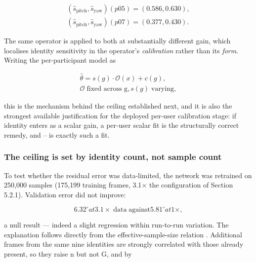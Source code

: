 \begin{equation}
\label{eq:219}
\begin{aligned}
( \hat{s}_{\mathrm{pitch}}, \hat{s}_{\mathrm{yaw}} )(p05) = ( 0.586, 0.630 ) , \\
( \hat{s}_{\mathrm{pitch}}, \hat{s}_{\mathrm{yaw}} )(p07) = ( 0.377, 0.430 ) .
\end{aligned}
\end{equation}

The same operator is applied to both at substantially different gain, which localises identity sensitivity in the operator's \emph{calibration} rather than its \emph{form}. Writing the per-participant model as

\begin{equation}
\label{eq:220}
\begin{aligned}
\hat{\theta } = s(g) \cdot \mathcal{O}(x) + c(g) , \\
\mathcal{O} \;\text{fixed across g} , s(g) \;\text{varying} ,
\end{aligned}
\end{equation}

this is the mechanism behind the ceiling established next, and it is also the strongest available justification for the deployed per-user calibration stage: if identity enters as a scalar gain, a per-user scalar fit is the structurally correct remedy, and -- is exactly such a fit.

\subsubsection{The ceiling is set by identity count, not sample count}

To test whether the residual error was data-limited, the network was retrained on 250,000 samples (175,199 training frames, 3.1$\times$ the configuration of Section 5.2.1). Validation error did not improve:

\begin{equation}
\label{eq:221}
6.32^{\circ} at 3.1\times \;\text{data}\; \mathrm{against} 5.81^{\circ} at 1\times ,
\end{equation}

a null result --- indeed a slight regression within run-to-run variation. The explanation follows directly from the effective-sample-size relation . Additional frames from the same nine identities are strongly correlated with those already present, so they raise n but not G, and by 

